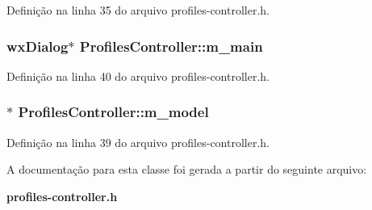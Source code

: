 Definição na linha 35 do arquivo profiles-\/controller.\+h.

\subsubsection[{m\+\_\+main}]{\setlength{\rightskip}{0pt plus 5cm}wx\+Dialog$\ast$ Profiles\+Controller\+::m\+\_\+main\hspace{0.3cm}{\ttfamily [protected]}}\label{class_profiles_controller_afb2ce196e0d18f4e8cd3ba30d57df367}


Definição na linha 40 do arquivo profiles-\/controller.\+h.

\subsubsection[{m\+\_\+model}]{$\ast$ Profiles\+Controller\+::m\+\_\+model\hspace{0.3cm}{\ttfamily [protected]}}\label{class_profiles_controller_a3f1556a58118f62f01df856d1099bb03}


Definição na linha 39 do arquivo profiles-\/controller.\+h.



A documentação para esta classe foi gerada a partir do seguinte arquivo\+:\begin{DoxyCompactItemize}
\item 
{\bf profiles-\/controller.\+h}\end{DoxyCompactItemize}
